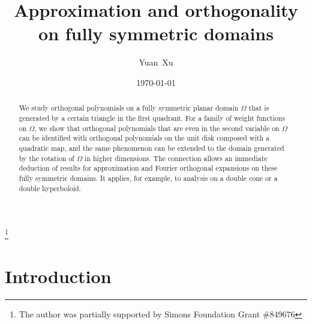 \documentclass{amsart}
\theoremstyle{remark}
\begin{document}
 
\title{Approximation and orthogonality on fully symmetric domains}
\author{Yuan~Xu}
\address{Department of Mathematics, University of Oregon, Eugene,
OR 97403--1222, USA}
\thanks{The author was partially supported by Simons Foundation Grant \#849676}
\date{\today}

\begin{abstract}
We study orthogonal polynomials on a fully symmetric planar domain $\Omega$ that is generated by 
a certain triangle in the first quadrant. For a family of weight functions on $\Omega$, we show that 
orthogonal polynomials that are even in the second variable on $\Omega$ can be identified with 
orthogonal polynomials on the unit disk composed with a quadratic map, and the same phenomenon 
can be extended to the domain generated by the rotation of $\Omega$ in higher dimensions. The  
connection allows an immediate deduction of results for approximation and Fourier orthogonal 
expansions on these fully symmetric domains. It applies, for example, to analysis on a double cone 
or a double hyperboloid. 
\end{abstract}

\maketitle

\section{Introduction}
\setcounter{equation}{0}
\end{document}
